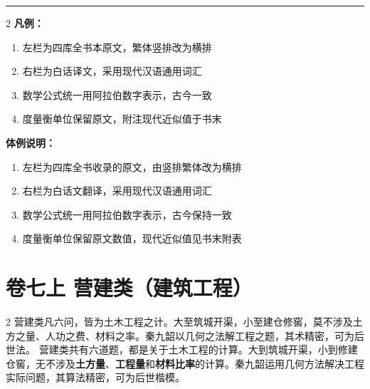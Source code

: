 \documentclass[11pt,a4paper]{article}
\begin{document}
\medskip
\noindent\rule{\textwidth}{0.6pt}
\medskip

\begin{paracol}{2}
\textbf{凡例：}
\begin{enumerate}
  \item 左栏为四库全书本原文，繁体竖排改为横排
  \item 右栏为白话译文，采用现代汉语通用词汇
  \item 数学公式统一用阿拉伯数字表示，古今一致
  \item 度量衡单位保留原文，附注现代近似值于书末
\end{enumerate}
\switchcolumn
\textbf{体例说明：}
\begin{enumerate}
  \item 左栏为四库全书收录的原文，由竖排繁体改为横排
  \item 右栏为白话文翻译，采用现代汉语通用词汇
  \item 数学公式统一用阿拉伯数字表示，古今保持一致
  \item 度量衡单位保留原文数值，现代近似值见书末附表
\end{enumerate}
\end{paracol}

\newpage

\section{卷七上 \quad 营建类（建筑工程）}
\label{sec:fasc7a}

\begin{center}
\end{center}

\medskip

\begin{paracol}{2}
营建类凡六问，皆为土木工程之计。大至筑城开渠，小至建仓修窖，莫不涉及土方之量、人功之费、材料之率。秦九韶以几何之法解工程之题，其术精密，可为后世法。
\switchcolumn
营建类共有六道题，都是关于土木工程的计算。大到筑城开渠，小到修建仓窖，无不涉及\textbf{土方量}、\textbf{工程量}和\textbf{材料比率}的计算。秦九韶运用几何方法解决工程实际问题，其算法精密，可为后世楷模。
\end{paracol}
\end{document}
